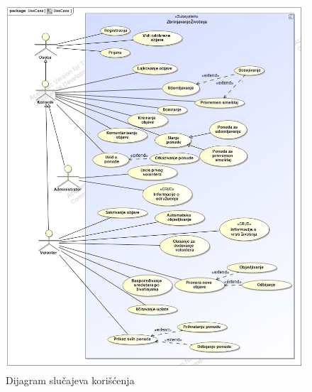 \documentclass[a4paper]{article}
\begin{document}
    \begin{figure}
        \centering
        \includegraphics[width=\textwidth]{img/use-case.jpg}
        \caption{Dijagram slučajeva korišćenja}
        \label{fig:use-case}
    \end{figure}
\end{document}
